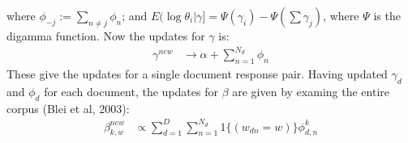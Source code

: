 \documentclass[a4paper]{article}
\begin{document}
where $\phi_{-j} := \sum_{n\not=j} \phi_n$; and $E(\log \theta_i | \gamma] = \Psi(\gamma_i) - \Psi(\sum \gamma_j)$, where $\Psi$ is the digamma function. Now the updates for $\gamma$ is: 
\begin{align*}
\gamma^{new} &\rightarrow \alpha + \sum_{n=1}^{N_d} \phi_n 
\end{align*}
These give the updates for a single document response pair. Having updated $\gamma_d$ and $\phi_d$ for each document, the updates for $\beta$ are given by examing the entire corpus (Blei et al, 2003): 
\begin{align*}
\beta^{new}_{k,w} &\propto \sum_{d=1}^D \sum_{n=1}^{N_d} 1\{(w_{dn} = w)\} \phi^k_{d,n}
\end{align*}
\end{document}
